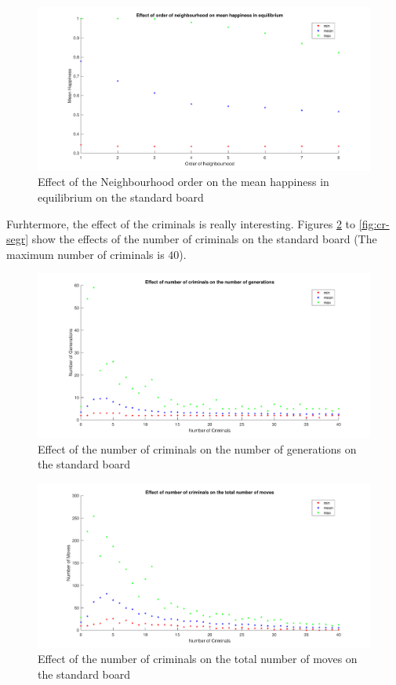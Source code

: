 \begin{figure}[H]
	\centering
    \includegraphics[width=\textwidth]{buurtorde-gemeindhappiness.pdf}
    \caption{Effect of the Neighbourhood order on the mean happiness in equilibrium on the standard board}
    \label{fig:nbho-happiness}
\end{figure}

Furhtermore, the effect of the criminals is really interesting. Figures \ref{fig:cr-aantgen} to \ref{fig:cr-segr} show the effects of the number of criminals on the standard board (The maximum number of criminals is $40$).

\begin{figure}[H]
	\centering
    \includegraphics[width=\textwidth]{aantcrim-aantgen.pdf}
    \caption{Effect of the number of criminals on the number of generations on the standard board }
    \label{fig:cr-aantgen}
\end{figure}

\begin{figure}[H]
	\centering
    \includegraphics[width=\textwidth]{aantcrim-aantmov.pdf}
    \caption{Effect of the number of criminals on the total number of moves on the standard board}
    \label{fig:cr-aantmov}
\end{figure}

